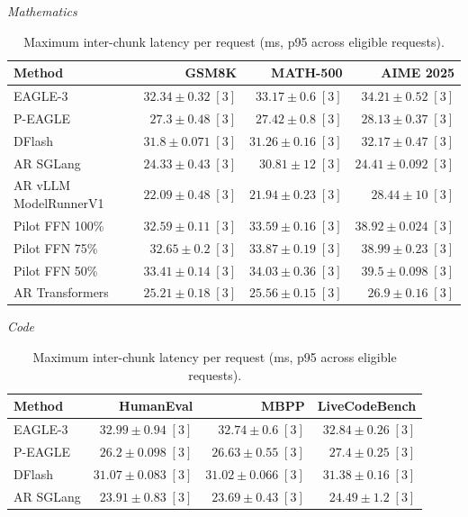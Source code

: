 \documentclass[conference,onecolumn]{IEEEtran}
\begin{document}
\begin{table}[!htp]
\centering\small
\setlength{\tabcolsep}{3pt}
\caption{Maximum inter-chunk latency per request (ms, p95 across eligible requests).}
\label{tab:appendix-metric-pause-none}
\textit{Mathematics}\par\smallskip
\begin{tabular}{@{}>{\raggedright\arraybackslash}p{3.7cm}rrr@{}}
\toprule
Method & GSM8K & MATH-500 & AIME 2025 \\
\midrule
EAGLE-3 & \(32.34 \pm 0.32\;[3]\) & \(33.17 \pm 0.6\;[3]\) & \(34.21 \pm 0.52\;[3]\) \\
P-EAGLE & \(27.3 \pm 0.48\;[3]\) & \(27.42 \pm 0.8\;[3]\) & \(28.13 \pm 0.37\;[3]\) \\
DFlash & \(31.8 \pm 0.071\;[3]\) & \(31.26 \pm 0.16\;[3]\) & \(32.17 \pm 0.47\;[3]\) \\
AR \textperiodcentered{} SGLang & \(24.33 \pm 0.43\;[3]\) & \(30.81 \pm 12\;[3]\) & \(\mathbf{24.41} \pm 0.092\;[3]\) \\
AR \textperiodcentered{} vLLM ModelRunnerV1 & \(\mathbf{22.09} \pm 0.48\;[3]\) & \(\mathbf{21.94} \pm 0.23\;[3]\) & \(28.44 \pm 10\;[3]\) \\
Pilot FFN 100\% & \(32.59 \pm 0.11\;[3]\) & \(33.59 \pm 0.16\;[3]\) & \(38.92 \pm 0.024\;[3]\) \\
Pilot FFN 75\% & \(32.65 \pm 0.2\;[3]\) & \(33.87 \pm 0.19\;[3]\) & \(38.99 \pm 0.23\;[3]\) \\
Pilot FFN 50\% & \(33.41 \pm 0.14\;[3]\) & \(34.03 \pm 0.36\;[3]\) & \(39.5 \pm 0.098\;[3]\) \\
AR \textperiodcentered{} Transformers & \(25.21 \pm 0.18\;[3]\) & \(25.56 \pm 0.15\;[3]\) & \(26.9 \pm 0.16\;[3]\) \\
\bottomrule
\end{tabular}\par\medskip
\textit{Code}\par\smallskip
\begin{tabular}{@{}>{\raggedright\arraybackslash}p{3.7cm}rrr@{}}
\toprule
Method & HumanEval & MBPP & LiveCodeBench \\
\midrule
EAGLE-3 & \(32.99 \pm 0.94\;[3]\) & \(32.74 \pm 0.6\;[3]\) & \(32.84 \pm 0.26\;[3]\) \\
P-EAGLE & \(26.2 \pm 0.098\;[3]\) & \(26.63 \pm 0.55\;[3]\) & \(27.4 \pm 0.25\;[3]\) \\
DFlash & \(31.07 \pm 0.083\;[3]\) & \(31.02 \pm 0.066\;[3]\) & \(31.38 \pm 0.16\;[3]\) \\
AR \textperiodcentered{} SGLang & \(23.91 \pm 0.83\;[3]\) & \(23.69 \pm 0.43\;[3]\) & \(24.49 \pm 1.2\;[3]\) \\

\end{tabular}
\end{table}
\end{document}
